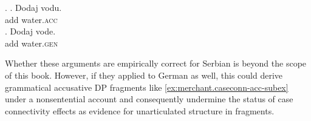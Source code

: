 \ex. \label{ex:serbian-case-quantification}
\ag. Dodaj vodu.\\
add water.\textsc{acc}\\
 \hfill {}
\bg. Dodaj vode.\\
add water.\textsc{gen}\\

Whether these arguments are empirically correct for Serbian is beyond the scope of this book. However, if they applied to German as well, this could derive grammatical accusative DP fragments like \ref{ex:merchant.caseconn-acc-subex} under a nonsentential account and consequently undermine the status of case connectivity effects as evidence for unarticulated structure in fragments. 

